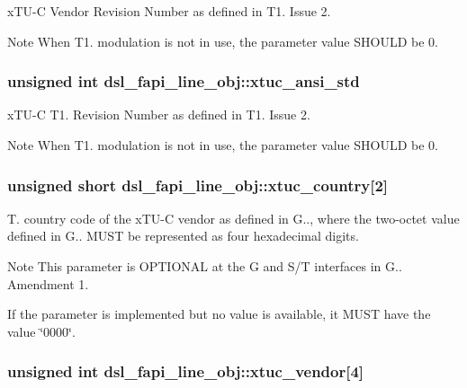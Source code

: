 x\-T\-U-\/\-C Vendor Revision Number as defined in T1. Issue 2. \begin{DoxyNote}{Note}
When T1. modulation is not in use, the parameter value S\-H\-O\-U\-L\-D be 0. 
\end{DoxyNote}
\hypertarget{structdsl__fapi__line__obj_a4a559c7aaa78e041ad41fdd131348baf}{
\subsubsection[{xtuc\-\_\-ansi\-\_\-std}]{\setlength{\rightskip}{0pt plus 5cm}unsigned int dsl\-\_\-fapi\-\_\-line\-\_\-obj\-::xtuc\-\_\-ansi\-\_\-std}}\label{structdsl__fapi__line__obj_a4a559c7aaa78e041ad41fdd131348baf}
x\-T\-U-\/\-C T1. Revision Number as defined in T1. Issue 2. \begin{DoxyNote}{Note}
When T1. modulation is not in use, the parameter value S\-H\-O\-U\-L\-D be 0. 
\end{DoxyNote}
\hypertarget{structdsl__fapi__line__obj_a8dae64b04014ddddf8cc044844eba5ec}{
\subsubsection[{xtuc\-\_\-country}]{\setlength{\rightskip}{0pt plus 5cm}unsigned short dsl\-\_\-fapi\-\_\-line\-\_\-obj\-::xtuc\-\_\-country\mbox{[}2\mbox{]}}}\label{structdsl__fapi__line__obj_a8dae64b04014ddddf8cc044844eba5ec}
T. country code of the x\-T\-U-\/\-C vendor as defined in G.., where the two-\/octet value defined in G.. M\-U\-S\-T be represented as four hexadecimal digits. \begin{DoxyNote}{Note}
This parameter is O\-P\-T\-I\-O\-N\-A\-L at the G and S/\-T interfaces in G.. Amendment 1. 

If the parameter is implemented but no value is available, it M\-U\-S\-T have the value \char`\"{}0000\char`\"{}. 
\end{DoxyNote}
\hypertarget{structdsl__fapi__line__obj_afe00cbdc588c0de8572cd43779cd1961}{
\subsubsection[{xtuc\-\_\-vendor}]{\setlength{\rightskip}{0pt plus 5cm}unsigned int dsl\-\_\-fapi\-\_\-line\-\_\-obj\-::xtuc\-\_\-vendor\mbox{[}4\mbox{]}}}\label{structdsl__fapi__line__obj_afe00cbdc588c0de8572cd43779cd1961}
